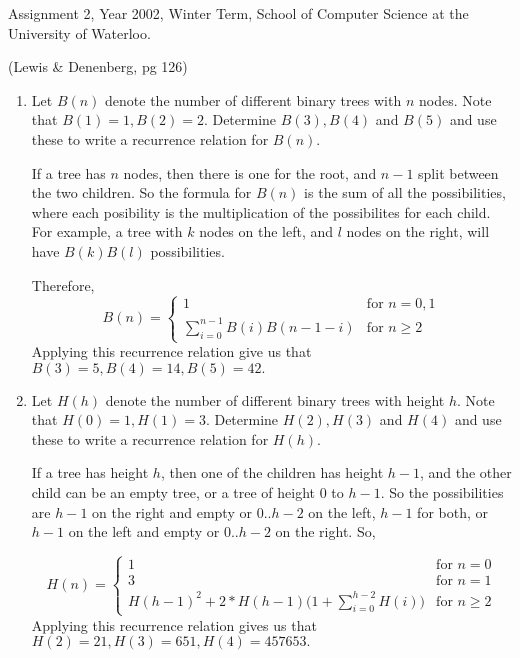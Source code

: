 \begin{usage}
Assignment 2, Year 2002, Winter Term, School of Computer Science at the University of Waterloo.
\end{usage}
\begin{authorship}
  (Lewis \& Denenberg, pg 126)
\end{authorship}

\begin{enumerate}
\item  Let $B(n)$ denote the number of different binary trees 
with $n$ nodes.  Note that $B(1)=1, B(2)=2$.  Determine
$B(3), B(4)$ and $B(5)$ and use these to write a recurrence
relation for $B(n)$.


\begin{solution}
  If a tree has $n$ nodes, then there is one for the root, and $n-1$
  split between the two children. So the formula for $B(n)$ is the sum
  of all the possibilities, where each posibility is the
  multiplication of the possibilites for each child. For example, a
  tree with $k$ nodes on the left, and $l$ nodes on the right, will
  have $B(k)B(l)$ possibilities.

Therefore,
\begin{displaymath}
B(n) = \left\{ 
\begin{array}{ll}
1 & \textrm{for $n=0,1$} \\ 
\sum_{i=0}^{n-1} B(i)B(n-1-i) & \textrm{for $n \geq 2$} 
\end{array} 
\right.
\end{displaymath}
Applying this recurrence relation give us that $B(3)=5, B(4)=14, B(5)=42.$

\end{solution}

\item Let $H(h)$ denote the number of different binary trees 
with height $h$.  Note that $H(0)=1, H(1)=3$.  Determine
$H(2), H(3)$ and $H(4)$ and use these to write a recurrence
relation for $H(h)$. 

\begin{solution}
  If a tree has height $h$, then one of the children has height $h-1$,
  and the other child can be an empty tree, or a tree of height $0$ to
  $h-1$. So the possibilities are $h-1$ on the right and empty or
  $0..h-2$ on the left, $h-1$ for both, or $h-1$ on the left and empty
  or $0..h-2$ on the right. So,

\begin{displaymath}
H(n) = \left\{
\begin{array}{ll}
1 & \textrm{for $n=0$} \\
3 & \textrm{for $n=1$} \\ 
H(h-1)^2 + 2*H(h-1) \Big( 1 + \sum_{i=0}^{h-2} H(i) \Big) & \textrm{for $n \geq 2$}
\end{array} \right.
\end{displaymath}
Applying this recurrence relation gives us that $H(2)=21, H(3)=651, H(4)=457653.$

\end{solution}
\end{enumerate}


